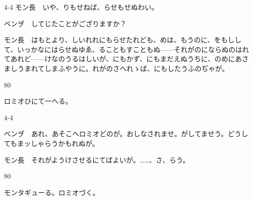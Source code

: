 \documentclass[tate,paper=b6j,jafontsize=9pt]{jlreq}
\begin{document}
\begin{azconvIndented}{4\zw}{-4\zw}
モン長　いや、りもせねば、らせもせぬわい。

ベンヺ　してじたことがござりますか？

モン長　はもとより、しいれれにもらせたれども、めは、もうのに、をもしして、いっかなにはらせぬゆゑ、ることもすこともぬ------それがのにならぬのはれてあれど------けなのうるはしいが、にもかず、にもまだえぬうちに、のめにあさましうまれてしまふやうに。れがのさへれゝば、にもしたうふのぢゃが。

\end{azconvIndented}
\begin{azconvIndented}{8\zw}{0\zw}

ロミオひにて一へる。

\end{azconvIndented}
\begin{azconvIndented}{4\zw}{-4\zw}

ベンヺ　あれ、あそこへロミオどのが。おしなされませ。がしてませう。どうしてもまッしゃらうかもれぬが。

モン長　それがようけさせるにてばよいが。……、さ、らう。

\end{azconvIndented}
\begin{azconvIndented}{8\zw}{0\zw}

モンタギューる。ロミオづく。

\end{azconvIndented}
\end{document}
